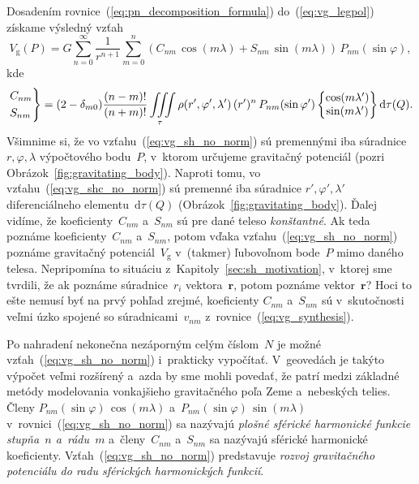 \documentclass[a4paper, 12pt]{book}
\newcommand{\diff}{\mathrm d}
\newcommand{\gidx}{\mathrm g}
\let\vec\mathbf
\begin{document}
Dosadením rovnice~(\ref{eq:pn_decomposition_formula}) do~(\ref{eq:vg_legpol})
získame výsledný vzťah
%
\begin{equation}
\label{eq:vg_sh_no_norm}
V_\gidx(P) = G \sum_{n = 0}^\infty \frac{1}{r^{n + 1}} \sum_{m = 0}^{n} \left(
C_{nm} \, \cos(m\lambda) + S_{nm} \, \sin(m\lambda)\right) \,
P_{nm}(\sin\varphi){,}
\end{equation}
%
kde
%
\begin{equation}
\label{eq:vg_shc_no_norm}
\begin{rcases}
C_{nm}\\
S_{nm}
\end{rcases}
= (2 - \delta_{m0}) \frac{(n - m)!}{(n + m)!} \iiint\limits_{\tau} \rho(r',
\varphi', \lambda') \, (r')^n \, P_{nm}(\sin\varphi')
%
\begin{Bmatrix}
\cos(m\lambda')\\
\sin(m\lambda')
\end{Bmatrix}
%
\diff\tau(Q){.}
\end{equation}
%
Všimnime si, že vo vzťahu~(\ref{eq:vg_sh_no_norm}) sú premennými iba súradnice 
$r, \varphi, \lambda$ výpočtového bodu~$P$, v~ktorom určujeme gravitačný 
potenciál (pozri Obrázok~\ref{fig:gravitating_body}).  Naproti tomu, vo 
vzťahu~(\ref{eq:vg_shc_no_norm}) sú premenné iba súradnice $r',\varphi', 
\lambda'$ diferenciálneho elementu~$\diff\tau(Q)$ 
(Obrázok~\ref{fig:gravitating_body}).  Ďalej vidíme, že koeficienty~$C_{nm}$ 
a~$S_{nm}$ sú pre dané teleso \emph{konštantné}.  Ak teda poznáme 
koeficienty~$C_{nm}$ a~$S_{nm}$, potom vďaka vzťahu~(\ref{eq:vg_sh_no_norm}) 
poznáme gravitačný potenciál~$V_\gidx$ v~(takmer) ľubovoľnom bode~$P$ mimo 
daného telesa.  Nepripomína to situáciu z~Kapitoly~\ref{sec:sh_motivation}, 
v~ktorej sme tvrdili, že ak poznáme súradnice~$r_i$ vektora~$\vec r$, potom 
poznáme vektor~$\vec r$?  Hoci to ešte nemusí byť na prvý pohľad zrejmé, 
koeficienty $C_{nm}$ a~$S_{nm}$ sú v~skutočnosti veľmi úzko spojené so 
súradnicami~$v_{nm}$ z~rovnice~(\ref{eq:vg_synthesis}).

Po nahradení nekonečna nezáporným celým číslom~$N$ je možné 
vzťah~(\ref{eq:vg_sh_no_norm}) i~prakticky vypočítať.  V~geovedách je takýto
výpočet veľmi rozšírený a~azda by sme mohli povedať, že patrí medzi základné  
metódy modelovania vonkajšieho
gravitačného poľa Zeme a~nebeských telies.  Členy $P_{nm}(\sin\varphi) \,
\cos(m\lambda)$ a~$ P_{nm}(\sin\varphi) \, \sin(m\lambda)$
v~rovnici~(\ref{eq:vg_sh_no_norm}) sa nazývajú \emph{plošné sférické harmonické
funkcie stupňa~$n$ a~rádu~$m$} a~členy~$C_{nm}$ a~$S_{nm}$ sa nazývajú sférické
harmonické koeficienty.  Vzťah~(\ref{eq:vg_sh_no_norm}) predstavuje
\emph{rozvoj gravitačného potenciálu do radu sférických harmonických funkcií}.
\end{document}
